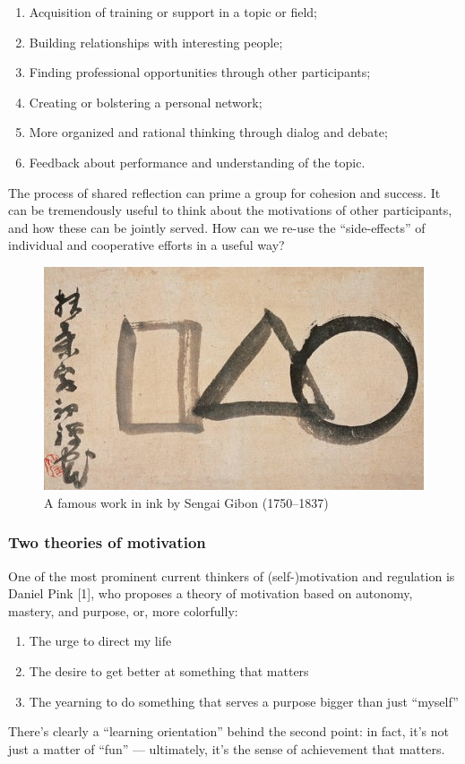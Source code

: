 \begin{enumerate}
\item
  Acquisition of training or support in a topic or field;
\item
  Building relationships with interesting people;
\item
  Finding professional opportunities through other participants;
\item
  Creating or bolstering a personal network;
\item
  More organized and rational thinking through dialog and debate;
\item
  Feedback about performance and understanding of the topic.
\end{enumerate}
The process of shared reflection can prime a group for cohesion and
success. It can be tremendously useful to think about the motivations of
other participants, and how these can be jointly served. How can we
re-use the ``side-effects'' of individual and cooperative efforts in a
useful way?

\begin{figure}
\begin{center}
\includegraphics[width=.8\textwidth]{../pictures/sengai.jpg}
\end{center}
\caption*{A famous work in ink by Sengai Gibon (1750--1837)}
\end{figure}

\subsubsection{Two theories of motivation}

One of the most prominent current thinkers of (self-)motivation and
regulation is Daniel Pink {[}1{]}, who proposes a theory of motivation
based on autonomy, mastery, and purpose, or, more colorfully:

\begin{enumerate}
\item
  The urge to direct my life
\item
  The desire to get better at something that matters
\item
  The yearning to do something that serves a purpose bigger than just
  ``myself''
\end{enumerate}
There's clearly a ``learning orientation'' behind the second point: in
fact, it's not just a matter of ``fun'' --- ultimately, it's the sense
of achievement that matters.

